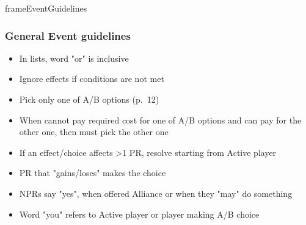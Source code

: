 \documentclass[10pt]{article}
\newlength{\fhEventGuidelines} \setlength\fhEventGuidelines{34.5\baselineskip}
\begin{document}
\begin{dynamiccontents*}{frameEventGuidelines}\begin{eubox}{\fhEventGuidelines}
	\begin{multicols*}{2}
		\subsubsection*{General Event guidelines }
		\begin{itemize}
			\item In lists, word "or" is inclusive
			\item Ignore effects if conditions are not met
			\item Pick only one of A/B options (p.~12)
			\item When cannot pay required cost for one of A/B options and can pay for the other one, then must pick the other one
			\item If an effect/choice affects >1 PR, resolve starting from Active player
			\item PR that "gains/loses" makes the choice
			\item NPRs say "yes", when offered Alliance or when they "may" do something
			\item Word "you" refers to Active player or player making A/B choice
		\end{itemize}
		

\end{multicols*}
\end{eubox}
\end{dynamiccontents*}
\end{document}
